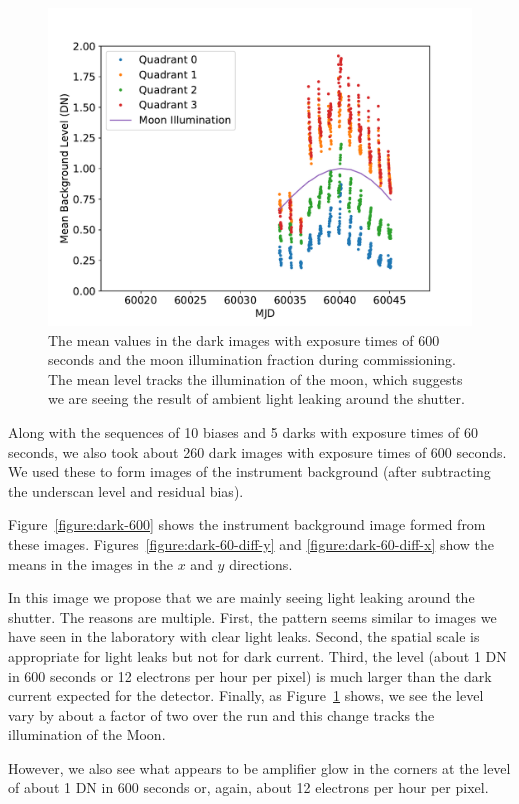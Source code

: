 \documentclass{article}
\begin{document}
\begin{figure}[pb]
\begin{center}
\includegraphics[width=0.7\columnwidth]{figures/dark-600-time.pdf}
\medskip
\caption{The mean values in the dark images with exposure times of 600 seconds and the moon illumination fraction during commissioning. The mean level tracks the illumination of the moon, which suggests we are seeing the result of ambient light leaking around the shutter.}
\label{figure:dark-600-time}
\end{center}
\end{figure}

Along with the sequences of 10 biases and 5 darks with exposure times of 60 seconds, we also took about 260 dark images with exposure times of 600 seconds. We used these to form images of the instrument background (after subtracting the underscan level and residual bias). 

Figure~\ref{figure:dark-600} shows the instrument background image formed from these images. Figures~\ref{figure:dark-60-diff-y} and \ref{figure:dark-60-diff-x} show the means in the images in the $x$ and $y$ directions.

In this image we propose that we are mainly seeing light leaking around the shutter. The reasons are multiple. First, the pattern seems similar to images we have seen in the laboratory with clear light leaks. Second, the spatial scale is appropriate for light leaks but not for dark current. Third, the level (about 1 DN in 600 seconds or 12 electrons per hour per pixel) is much larger than the dark current expected for the detector. Finally, as Figure~\ref{figure:dark-600-time} shows, we see the level vary by about a factor of two over the run and this change tracks the illumination of the Moon.

However, we also see what appears to be amplifier glow in the corners at the level of about 1 DN in 600 seconds or, again, about 12 electrons per hour per pixel.
\end{document}
